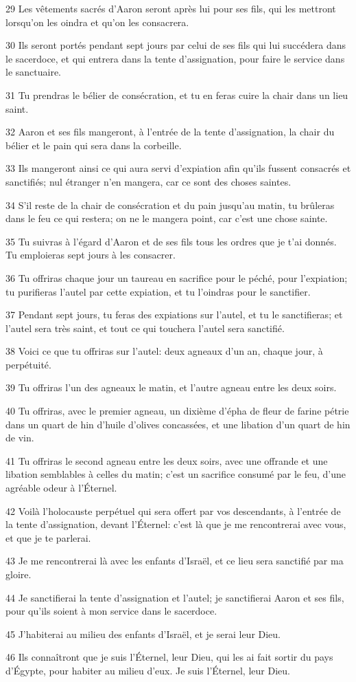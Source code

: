 \par 29 Les vêtements sacrés d'Aaron seront après lui pour ses fils, qui les mettront lorsqu'on les oindra et qu'on les consacrera.
\par 30 Ils seront portés pendant sept jours par celui de ses fils qui lui succédera dans le sacerdoce, et qui entrera dans la tente d'assignation, pour faire le service dans le sanctuaire.
\par 31 Tu prendras le bélier de consécration, et tu en feras cuire la chair dans un lieu saint.
\par 32 Aaron et ses fils mangeront, à l'entrée de la tente d'assignation, la chair du bélier et le pain qui sera dans la corbeille.
\par 33 Ils mangeront ainsi ce qui aura servi d'expiation afin qu'ils fussent consacrés et sanctifiés; nul étranger n'en mangera, car ce sont des choses saintes.
\par 34 S'il reste de la chair de consécration et du pain jusqu'au matin, tu brûleras dans le feu ce qui restera; on ne le mangera point, car c'est une chose sainte.
\par 35 Tu suivras à l'égard d'Aaron et de ses fils tous les ordres que je t'ai donnés. Tu emploieras sept jours à les consacrer.
\par 36 Tu offriras chaque jour un taureau en sacrifice pour le péché, pour l'expiation; tu purifieras l'autel par cette expiation, et tu l'oindras pour le sanctifier.
\par 37 Pendant sept jours, tu feras des expiations sur l'autel, et tu le sanctifieras; et l'autel sera très saint, et tout ce qui touchera l'autel sera sanctifié.
\par 38 Voici ce que tu offriras sur l'autel: deux agneaux d'un an, chaque jour, à perpétuité.
\par 39 Tu offriras l'un des agneaux le matin, et l'autre agneau entre les deux soirs.
\par 40 Tu offriras, avec le premier agneau, un dixième d'épha de fleur de farine pétrie dans un quart de hin d'huile d'olives concassées, et une libation d'un quart de hin de vin.
\par 41 Tu offriras le second agneau entre les deux soirs, avec une offrande et une libation semblables à celles du matin; c'est un sacrifice consumé par le feu, d'une agréable odeur à l'Éternel.
\par 42 Voilà l'holocauste perpétuel qui sera offert par vos descendants, à l'entrée de la tente d'assignation, devant l'Éternel: c'est là que je me rencontrerai avec vous, et que je te parlerai.
\par 43 Je me rencontrerai là avec les enfants d'Israël, et ce lieu sera sanctifié par ma gloire.
\par 44 Je sanctifierai la tente d'assignation et l'autel; je sanctifierai Aaron et ses fils, pour qu'ils soient à mon service dans le sacerdoce.
\par 45 J'habiterai au milieu des enfants d'Israël, et je serai leur Dieu.
\par 46 Ils connaîtront que je suis l'Éternel, leur Dieu, qui les ai fait sortir du pays d'Égypte, pour habiter au milieu d'eux. Je suis l'Éternel, leur Dieu.

